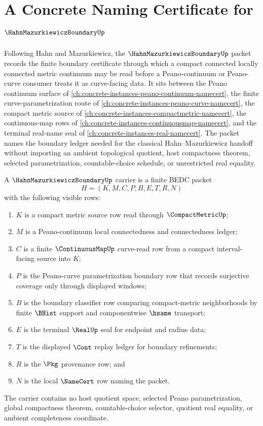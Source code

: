 \chapter{A Concrete Naming Certificate for $\HahnMazurkiewiczBoundaryUp$}
\label{ch:concrete-instances-hahn-mazurkiewicz-boundary-namecert}

Following Hahn and Mazurkiewicz, the $\HahnMazurkiewiczBoundaryUp$ packet records the finite boundary certificate through which a compact connected locally connected metric continuum may be read before a Peano-continuum or Peano-curve consumer treats it as curve-facing data. It sits between the Peano continuum surface of \autoref{ch:concrete-instances-peano-continuum-namecert}, the finite curve-parametrization route of \autoref{ch:concrete-instances-peano-curve-namecert}, the compact metric source of \autoref{ch:concrete-instances-compactmetric-namecert}, the continuous-map rows of \autoref{ch:concrete-instances-continuousmap-namecert}, and the terminal real-name seal of \autoref{ch:concrete-instances-real-namecert}. The packet names the boundary ledger needed for the classical Hahn--Mazurkiewicz handoff without importing an ambient topological quotient, host compactness theorem, selected parametrization, countable-choice schedule, or unrestricted real equality.

\begin{definition}
\label{def:hahn-mazurkiewicz-boundary-carrier}
A $\HahnMazurkiewiczBoundaryUp$ carrier is a finite BEDC packet
$$
H=(K,M,C,P,B,E,T,R,N)
$$
with the following visible rows:
\begin{enumerate}
\item $K$ is a compact metric source row read through $\CompactMetricUp$;
\item $M$ is a Peano-continuum local connectedness and connectedness ledger;
\item $C$ is a finite $\ContinuousMapUp$ curve-read row from a compact interval-facing source into $K$;
\item $P$ is the Peano-curve parametrization boundary row that records surjective coverage only through displayed windows;
\item $B$ is the boundary classifier row comparing compact-metric neighborhoods by finite $\BHist$ support and componentwise $\hsame$ transport;
\item $E$ is the terminal $\RealUp$ seal for endpoint and radius data;
\item $T$ is the displayed $\Cont$ replay ledger for boundary refinements;
\item $R$ is the $\Pkg$ provenance row; and
\item $N$ is the local $\NameCert$ row naming the packet.
\end{enumerate}
The carrier contains no host quotient space, selected Peano parametrization, global compactness theorem, countable-choice selector, quotient real equality, or ambient completeness coordinate.
\end{definition}

